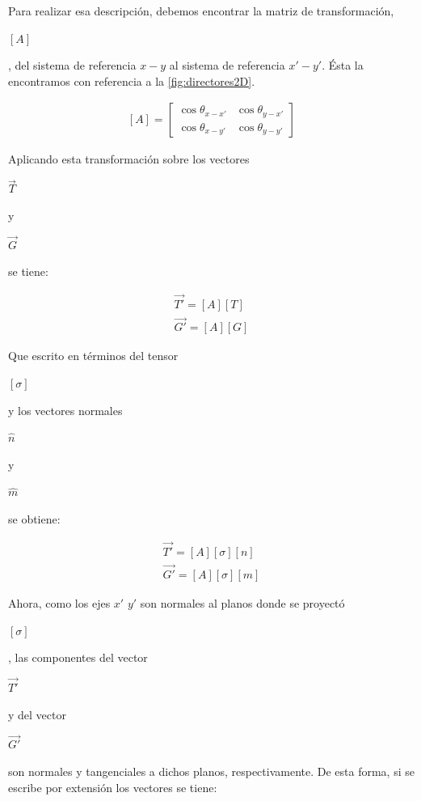 \documentclass[12pt,letterpaper, twoside, openany]{article}
\begin{document}
Para realizar esa descripción, debemos encontrar la matriz de transformación, \begin{large} $\left[ A \right]$\end{large}, del sistema de referencia $x-y$ al sistema de referencia $x'-y'$. Ésta la encontramos con referencia a la \cref{fig:directores2D}.
%
\begin{large}
	\begin{align}
		\left[A\right]=
		\left[ \begin{array}{cc}
		\cos \theta_{x-x'} & \cos \theta_{y-x'} \\  
		\cos \theta_{x-y'} & \cos \theta_{y-y'}
		\end{array}  \right] 
		\label{eq:transfoma2D}
	\end{align}
\end{large}
%
Aplicando esta transformación sobre los vectores \begin{large} $\overset{\rightarrow}{T}$\end{large} y \begin{large} $\overset{\rightarrow}{G}$\end{large} se tiene: 
%
 \begin{large}
	\begin{align}
		\overset{\rightarrow}{T'}= \left[ A \right] \left[ T \right]\label{eq:Ttransf} \\
		\overset{\rightarrow}{G'}= \left[ A \right] \left[ G \right]\label{eq:Gtransf} 		
	\end{align}
\end{large}
%
Que escrito en términos del tensor  \begin{large} $\left[ \sigma \right]$\end{large} y los vectores normales \begin{large} $\hat{n}$\end{large} y \begin{large} $\hat{m}$\end{large} se obtiene: 
 \begin{large}
	\begin{align}
		\overset{\rightarrow}{T'}= \left[ A \right] \left[ \sigma \right] \left[ n \right]\label{eq:Ttransf0}\\
		\overset{\rightarrow}{G'}= \left[ A \right] \left[ \sigma \right] \left[ m\right]\label{eq:Gtransf0}
	\end{align}
\end{large}
%
Ahora,  como los ejes $x'$ $y'$ son normales al planos donde se proyectó \begin{large} $\left[ \sigma \right]$\end{large}, las componentes del vector \begin{large} $\overset{\rightarrow}{T'}$\end{large} y del vector  \begin{large} $\overset{\rightarrow}{G'}$\end{large} son normales y tangenciales a dichos planos, respectivamente. De esta forma, si se escribe por extensión los vectores se tiene:
\end{document}
